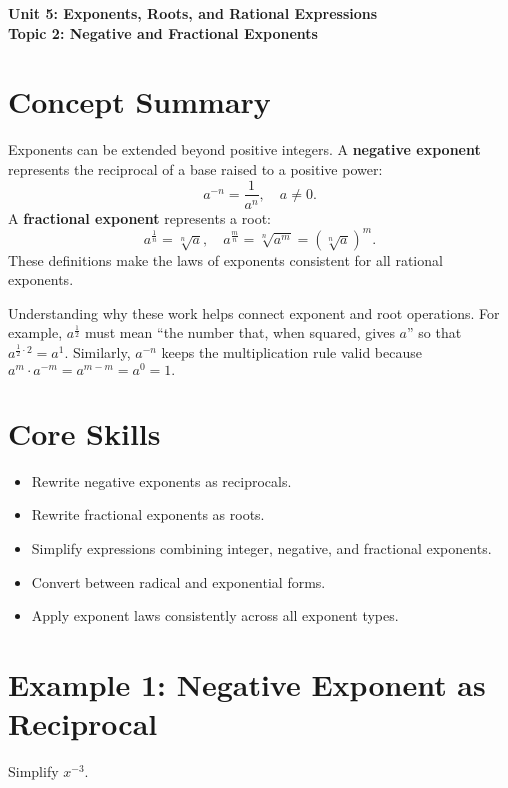 \documentclass[12pt]{article}
\begin{document}
\begin{center}
    \LARGE \textbf{Unit 5: Exponents, Roots, and Rational Expressions} \\[6pt]
    \Large \textbf{Topic 2: Negative and Fractional Exponents}
\end{center}

\vspace{1em}

\section*{Concept Summary}

Exponents can be extended beyond positive integers.  
A \textbf{negative exponent} represents the reciprocal of a base raised to a positive power:
\[
a^{-n} = \frac{1}{a^n}, \quad a \ne 0.
\]
A \textbf{fractional exponent} represents a root:
\[
a^{\frac{1}{n}} = \sqrt[n]{a}, \quad a^{\frac{m}{n}} = \sqrt[n]{a^m} = (\sqrt[n]{a})^m.
\]
These definitions make the laws of exponents consistent for all rational exponents.

Understanding why these work helps connect exponent and root operations.  
For example, \(a^{\frac{1}{2}}\) must mean “the number that, when squared, gives \(a\)” so that \(a^{\frac{1}{2}\cdot 2} = a^1\).  
Similarly, \(a^{-n}\) keeps the multiplication rule valid because \(a^m \cdot a^{-m} = a^{m-m} = a^0 = 1.\)

\section*{Core Skills}
\begin{itemize}
  \item Rewrite negative exponents as reciprocals.
  \item Rewrite fractional exponents as roots.
  \item Simplify expressions combining integer, negative, and fractional exponents.
  \item Convert between radical and exponential forms.
  \item Apply exponent laws consistently across all exponent types.
\end{itemize}

\section*{Example 1: Negative Exponent as Reciprocal}

Simplify \(x^{-3}\).
\end{document}
